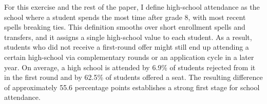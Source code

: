 \documentclass[a4paper, article, english, oneside, unknownkeysallowed, 12pt]{memoir}
\begin{document}
For this exercise and the rest of the paper, I define high-school attendance as the school where a student spends the most time after grade 8, with most recent spells breaking ties.
This definition smooths over short enrollment spells and transfers, and it assigns a single high-school value to each student.
As a result, students who did not receive a first-round offer might still end up attending a certain high-school via complementary rounds or an application cycle in a later year.
On average, a high school is attended by 6.9\% of students rejected from it in the first round and by 62.5\% of students offered a seat.
The resulting difference of approximately 55.6 percentage points establishes a strong first stage for school attendance.







\end{document}
